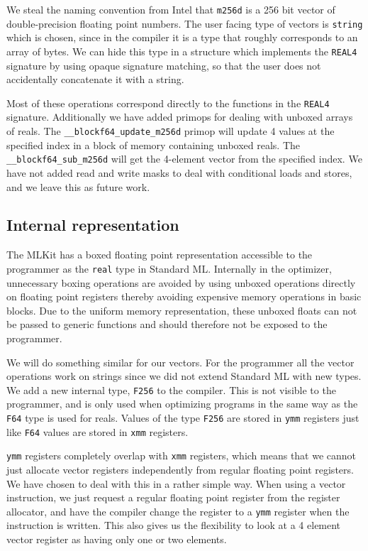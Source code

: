 \documentclass{article}
\begin{document}
We steal the naming convention from Intel that \texttt{m256d} is a 256 bit vector of double-precision floating point numbers. The user facing type of vectors is \verb!string! which is chosen, since in the compiler it is a type that roughly corresponds to an array of bytes. We can hide this type in a structure which implements the \texttt{REAL4} signature by using opaque signature matching, so that the user does not accidentally concatenate it with a string.

Most of these operations correspond directly to the functions in the \texttt{REAL4} signature. Additionally we have added primops for dealing with unboxed arrays of reals. The \verb!__blockf64_update_m256d! primop will update 4 values at the specified index in a block of memory containing unboxed reals. The \verb!__blockf64_sub_m256d! will get the 4-element vector from the specified index. We have not added read and write masks to deal with conditional loads and stores, and we leave this as future work.
    
\subsection{Internal representation}

The MLKit has a boxed floating point representation accessible to the programmer as the \verb!real! type in Standard ML. Internally in the optimizer, unnecessary boxing operations are avoided by using unboxed operations directly on floating point registers thereby avoiding expensive memory operations in basic blocks. Due to the uniform memory representation, these unboxed floats can not be passed to generic functions and should therefore not be exposed to the programmer.

We will do something similar for our vectors. For the programmer all the vector operations work on strings since we did not extend Standard ML with new types. We add a new internal type, \texttt{F256} to the compiler. This is not visible to the programmer, and is only used when optimizing programs in the same way as the \texttt{F64} type is used for reals. Values of the type \texttt{F256} are stored in \texttt{ymm} registers just like \texttt{F64} values are stored in \texttt{xmm} registers.

\texttt{ymm} registers completely overlap with \texttt{xmm} registers, which means that we cannot just allocate vector registers independently from regular floating point registers. We have chosen to deal with this in a rather simple way. When using a vector instruction, we just request a regular floating point register from the register allocator, and have the compiler change the register to a \texttt{ymm} register when the instruction is written. This also gives us the flexibility to look at a 4 element vector register as having only one or two elements.
\end{document}
